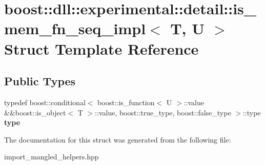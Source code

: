 \hypertarget{a00177}{}\section{boost\+:\+:dll\+:\+:experimental\+:\+:detail\+:\+:is\+\_\+mem\+\_\+fn\+\_\+seq\+\_\+impl$<$ T, U $>$ Struct Template Reference}
\label{a00177}
\subsection*{Public Types}
\begin{DoxyCompactItemize}
\item 
typedef boost\+::conditional$<$ boost\+::is\+\_\+function$<$ U $>$\+::value \&\&boost\+::is\+\_\+object$<$ T $>$\+::value, boost\+::true\+\_\+type, boost\+::false\+\_\+type $>$\+::type {\bfseries type}\hypertarget{a00177_aec1a5860cdcd1498eaeb3ce7ee7f5373}{}\label{a00177_aec1a5860cdcd1498eaeb3ce7ee7f5373}

\end{DoxyCompactItemize}


The documentation for this struct was generated from the following file\+:\begin{DoxyCompactItemize}
\item 
import\+\_\+mangled\+\_\+helpers.\+hpp\end{DoxyCompactItemize}
